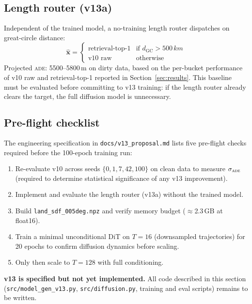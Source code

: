 \documentclass[11pt,a4paper]{article}
\newcommand{\ade}{\textsc{ade}}
\begin{document}
\subsection{Length router (v13a)}

Independent of the trained model, a no-training length router dispatches on
great-circle distance:
\[
  \hat{\mathbf{x}} = \begin{cases}
    \text{retrieval-top-1} & \text{if } d_\text{GC} > 500\,km \\
    \text{v10 raw}         & \text{otherwise}
  \end{cases}
\]
Projected \ade{}: 5500--5800\,m on dirty data, based on the per-bucket
performance of v10 raw and retrieval-top-1 reported in Section~\ref{sec:results}.
This baseline must be evaluated before committing to v13 training: if the length
router already clears the target, the full diffusion model is unnecessary.

\subsection{Pre-flight checklist}

The engineering specification in \texttt{docs/v13\_proposal.md} lists five
pre-flight checks required before the 100-epoch training run:
\begin{enumerate}
  \item Re-evaluate v10 across seeds $\{0, 1, 7, 42, 100\}$ on clean data to
        measure $\sigma_\ade{}$ (required to determine statistical significance
        of any v13 improvement).
  \item Implement and evaluate the length router (v13a) without the trained model.
  \item Build \texttt{land\_sdf\_005deg.npz} and verify memory budget
        ($\approx$2.3\,GB at float16).
  \item Train a minimal unconditional DiT on $T=16$ (downsampled trajectories)
        for 20 epochs to confirm diffusion dynamics before scaling.
  \item Only then scale to $T=128$ with full conditioning.
\end{enumerate}

\textbf{v13 is specified but not yet implemented.}
All code described in this section (\texttt{src/model\_gen\_v13.py},
\texttt{src/diffusion.py}, training and eval scripts) remains to be written.



\end{document}
